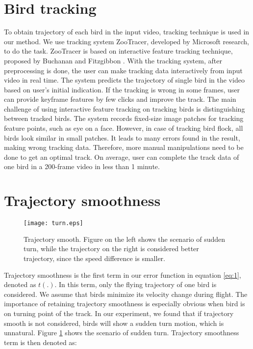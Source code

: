 \section{Bird tracking}


To obtain trajectory of each bird in the input video, tracking technique is used in our method. We use tracking system ZooTracer\cite{ZooTracer}, developed by Microsoft research, to do the task. ZooTracer is based on interactive feature tracking technique, proposed by Buchanan and Fitzgibbon \cite{Tracking}. With the tracking system, after preprocessing is done, the user can make tracking data interactively from input video in real time. The system predicts the trajectory of single bird in the video based on user's initial indication. If the tracking is wrong in some frames, user can provide keyframe features by few clicks and improve the track.
The main challenge of using interactive feature tracking on tracking birds is distinguishing between tracked birds. The system records fixed-size image patches for tracking feature points, such as eye on a face. However, in case of tracking bird flock, all birds look similar in small patches. It leads to many errors found in the result, making wrong tracking data. Therefore, more manual manipulations need to be done to get an optimal track. On average, user can complete the track data of one bird in a 200-frame video in less than 1 minute.



\section{Trajectory smoothness}


\begin{figure}[h]
 \begin{center}
  \texttt{[image: turn.eps]}
 \end{center}
 \caption{Trajectory smooth. Figure on the left shows the scenario of sudden turn, while the trajectory on the right is considered better trajectory, since the speed difference is smaller.}
 \label{figure:turn}
\end{figure}



Trajectory smoothness is the first term in our error function in equation \ref{eq:1}, denoted as $t(.)$. In this term, only the flying trajectory of one bird is considered. We assume that birds minimize its velocity change during flight. The importance of retaining trajectory smoothness is especially obvious when bird is on turning point of the track. In our experiment, we found that if trajectory smooth is not considered, birds will show a sudden turn motion, which is unnatural. Figure \ref{figure:turn} shows the scenario of sudden turn. Trajectory smoothness term is then denoted as:

